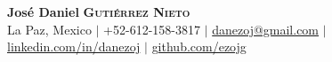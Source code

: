 \begin{center}
    {\LARGE 
    \textbf{José Daniel}
    \textbf{\scshape Gutiérrez Nieto}
    }
    \\ \vspace{1ex}
    La Paz, Mexico $|$ 
    +52-612-158-3817 $|$ 
    \href{mailto:danezoj@gmail.com}{danezoj@gmail.com} $|$ 
    \href{https://linkedin.com/in/danezoj/}{linkedin.com/in/danezoj} $|$
    \href{https://github.com/ezojg/}{github.com/ezojg}
\end{center}
